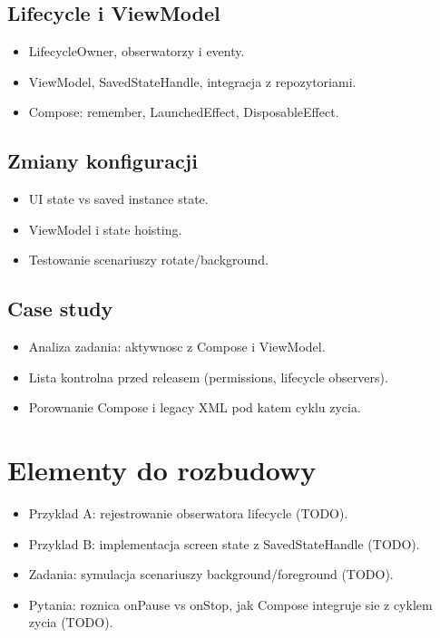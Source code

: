 \subsection{Lifecycle i ViewModel}
\begin{itemize}
  \item LifecycleOwner, obserwatorzy i eventy.
  \item ViewModel, SavedStateHandle, integracja z repozytoriami.
  \item Compose: remember, LaunchedEffect, DisposableEffect.
\end{itemize}

\subsection{Zmiany konfiguracji}
\begin{itemize}
  \item UI state vs saved instance state.
  \item ViewModel i state hoisting.
  \item Testowanie scenariuszy rotate/background.
\end{itemize}

\subsection{Case study}
\begin{itemize}
  \item Analiza zadania: aktywnosc z Compose i ViewModel.
  \item Lista kontrolna przed releasem (permissions, lifecycle observers).
  \item Porownanie Compose i legacy XML pod katem cyklu zycia.
\end{itemize}

\section{Elementy do rozbudowy}
\begin{itemize}
  \item Przyklad A: rejestrowanie obserwatora lifecycle (TODO).
  \item Przyklad B: implementacja screen state z SavedStateHandle (TODO).
  \item Zadania: symulacja scenariuszy background/foreground (TODO).
  \item Pytania: roznica onPause vs onStop, jak Compose integruje sie z cyklem zycia (TODO).
\end{itemize}


